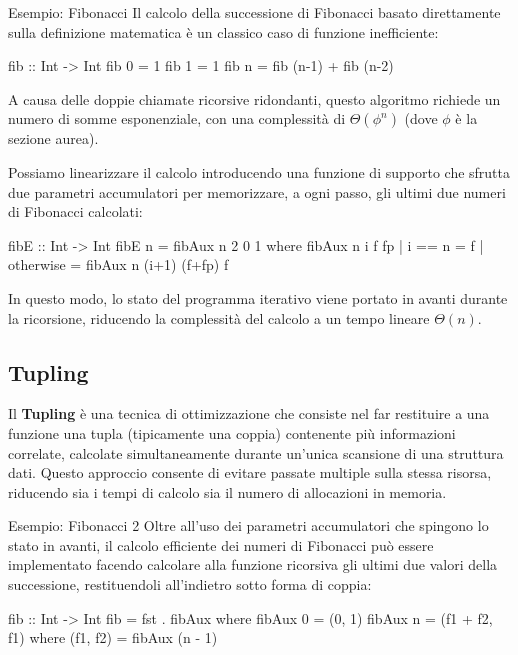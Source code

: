 \begin{gframe}{Esempio: Fibonacci}
Il calcolo della successione di Fibonacci basato direttamente sulla definizione matematica è un classico caso di funzione inefficiente:
\begin{haskellbox}{}
fib :: Int -> Int
fib 0 = 1
fib 1 = 1
fib n = fib (n-1) + fib (n-2)
\end{haskellbox}

A causa delle doppie chiamate ricorsive ridondanti, questo algoritmo richiede un numero di somme esponenziale, con una complessità di $\Theta(\phi^n)$ (dove $\phi$ è la sezione aurea).

Possiamo linearizzare il calcolo introducendo una funzione di supporto  che sfrutta due parametri accumulatori per memorizzare, a ogni passo, gli ultimi due numeri di Fibonacci calcolati:

\begin{haskellbox}{}
fibE :: Int -> Int
fibE n = fibAux n 2 0 1
  where
    fibAux n i f fp
      | i == n    = f
      | otherwise = fibAux n (i+1) (f+fp) f
\end{haskellbox}

In questo modo, lo stato del programma iterativo viene portato in avanti durante la ricorsione, riducendo la complessità del calcolo a un tempo lineare $\Theta(n)$.
\end{gframe}

\subsection{Tupling}
Il \textbf{Tupling} è una tecnica di ottimizzazione che consiste nel far restituire a una funzione una tupla (tipicamente una coppia) contenente più informazioni correlate, calcolate simultaneamente durante un'unica scansione di una struttura dati. Questo approccio consente di evitare passate multiple sulla stessa risorsa, riducendo sia i tempi di calcolo sia il numero di allocazioni in memoria.

\begin{gframe}{Esempio: Fibonacci 2}
Oltre all'uso dei parametri accumulatori che spingono lo stato in avanti, il calcolo efficiente dei numeri di Fibonacci può essere implementato facendo calcolare alla funzione ricorsiva gli ultimi due valori della successione, restituendoli all'indietro sotto forma di coppia:

\begin{haskellbox}{}
fib :: Int -> Int
fib = fst . fibAux
  where
    fibAux 0 = (0, 1)
    fibAux n = (f1 + f2, f1)
      where
        (f1, f2) = fibAux (n - 1)
\end{haskellbox}
\end{gframe}

